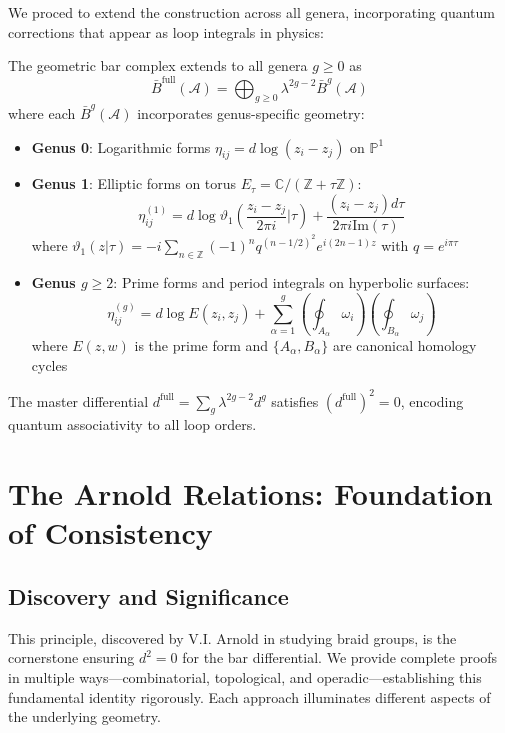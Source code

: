 We proced to extend the construction across all genera, incorporating quantum corrections that appear as loop integrals in physics:

\begin{theorem}
The geometric bar complex extends to all genera $g \geq 0$ as
$$\bar{B}^{\text{full}}(\mathcal{A}) = \bigoplus_{g \geq 0} \lambda^{2g-2} \bar{B}^g(\mathcal{A})$$
where each $\bar{B}^g(\mathcal{A})$ incorporates genus-specific geometry:
\begin{itemize}
\item \textbf{Genus 0}: Logarithmic forms $\eta_{ij} = d\log(z_i - z_j)$ on $\mathbb{P}^1$
\item \textbf{Genus 1}: Elliptic forms on torus $E_\tau = \mathbb{C}/(\mathbb{Z} + \tau\mathbb{Z})$:
  $$\eta_{ij}^{(1)} = d\log\vartheta_1\left(\frac{z_i - z_j}{2\pi i}|\tau\right) + \frac{(z_i - z_j)d\tau}{2\pi i \text{Im}(\tau)}$$
  where $\vartheta_1(z|\tau) = -i\sum_{n \in \mathbb{Z}}(-1)^n q^{(n-1/2)^2}e^{i(2n-1)z}$ with $q = e^{i\pi\tau}$
\item \textbf{Genus $g \geq 2$}: Prime forms and period integrals on hyperbolic surfaces:
  $$\eta_{ij}^{(g)} = d\log E(z_i, z_j) + \sum_{\alpha=1}^g \left(\oint_{A_\alpha} \omega_i\right) \left(\oint_{B_\alpha} \omega_j\right)$$
  where $E(z,w)$ is the prime form and $\{A_\alpha, B_\alpha\}$ are canonical homology cycles
\end{itemize}
The master differential $d^{\text{full}} = \sum_{g} \lambda^{2g-2} d^g$ satisfies $(d^{\text{full}})^2 = 0$, encoding quantum associativity to all loop orders.
\end{theorem}

\section{The Arnold Relations: Foundation of Consistency}

\subsection{Discovery and Significance}

This principle, discovered by V.I. Arnold in studying braid groups, is the cornerstone ensuring $d^2 = 0$ for the bar differential. We provide complete proofs in multiple ways—combinatorial, topological, and operadic—establishing this fundamental identity rigorously. Each approach illuminates different aspects of the underlying geometry.

